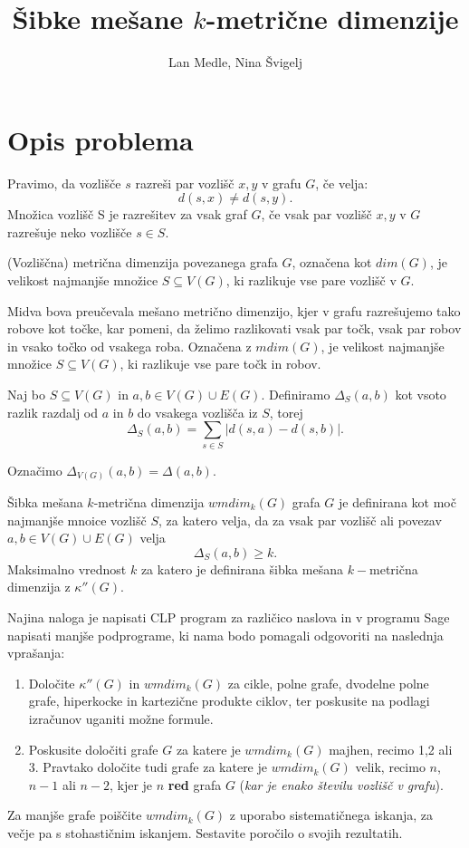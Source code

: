 \documentclass{article}
\author{Lan Medle, Nina Švigelj}
\title{Šibke mešane $k$-metrične dimenzije}
\theoremstyle{definition}
\begin{document}
\maketitle

\section{Opis problema}
Pravimo, da vozlišče $s$ razreši par vozlišč $x,y$ v grafu $G$, če velja: $$d(s,x) \neq d(s,y).$$
Množica vozlišč S je razrešitev za vsak graf $G$, če vsak par vozlišč $x,y$ v $G$ razrešuje neko vozlišče $s \in S.$

(Vozliščna) metrična dimenzija povezanega grafa $G$, označena kot $dim(G)$, je velikost najmanjše množice $S\subseteq V(G)$, ki razlikuje vse pare vozlišč v $G$.

Midva bova preučevala mešano metrično dimenzijo, kjer v grafu razrešujemo tako robove kot točke, kar pomeni, da želimo razlikovati vsak par točk, vsak par robov in vsako točko od vsakega roba. Označena z $mdim(G)$, je velikost najmanjše množice $S \subseteq V(G)$, ki razlikuje vse pare točk in robov.

Naj bo $S \subseteq V(G)$ in $a,b \in V(G) \cup E(G)$. Definiramo $\Delta_S (a,b)$ kot vsoto razlik razdalj od $a$ in $b$ do vsakega vozlišča iz $S$, torej $$\Delta_S(a,b) = \sum_{s\in S} |d(s,a) - d(s,b)|.$$

\noindent
Označimo $\Delta_{V(G)} (a,b) = \Delta(a,b)$.

Šibka mešana $k$-metrična dimenzija $wmdim_k(G)$ grafa $G$ je definirana kot moč najmanjše mnoice vozlišč $S$, za katero velja, da za vsak par vozlišč ali povezav $a,b \in V(G) \cup E(G)$ velja $$\Delta_S(a,b) \ge k.$$
\noindent
Maksimalno vrednost $k$ za katero je definirana šibka mešana $k-$metrična dimenzija z $\kappa''(G).$


\vspace{0.3cm}
\noindent
Najina naloga je napisati CLP program za različico naslova in v programu Sage napisati manjše podprograme, ki nama bodo pomagali odgovoriti na naslednja vprašanja:
\begin{enumerate}
    \item Določite $\kappa''(G)$ in $wmdim_k(G)$ za cikle, polne grafe, dvodelne polne grafe, hiperkocke in kartezične produkte ciklov, ter poskusite na podlagi izračunov uganiti možne formule.
    \item Poskusite določiti grafe $G$ za katere je $wmdim_k(G)$ majhen, recimo 1,2 ali 3. Pravtako določite tudi grafe za katere je $wmdim_k(G)$ velik, recimo $n$, $n-1$ ali $n-2$, kjer je $n$ \textbf{red} grafa $G$ (\textit{kar je enako številu vozlišč v grafu}).
\end{enumerate}
Za manjše grafe poiščite $wmdim_k(G)$ z uporabo sistematičnega iskanja, za večje pa s stohastičnim iskanjem. Sestavite poročilo o svojih rezultatih.
\end{document}
